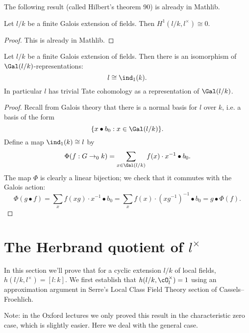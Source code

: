 The following result (called Hilbert's theorem 90) is already in Mathlib.

\begin{theorem}\label{thm:hilbert 90}
	\mathlibok
	Let $l/k$ be a finite Galois extension of fields.
	Then $H^1(l/k, l^\times) \cong 0$.
\end{theorem}

\begin{proof}
	\mathlibok
	This is already in Mathlib.
\end{proof}

\begin{theorem}\label{thm:additive field trivial}
	\leanok
	Let $l/k$ be a finite Galois extension of fields.
	Then there is an isomorphism of $\Gal(l/k)$-representations:
	\[
		l \cong \ind_1(k).
	\]
	In particular $l$ has trivial Tate cohomology as a representation of $\Gal(l/k)$.
\end{theorem}

\begin{proof}
	\leanok
	Recall from Galois theory that there is a normal basis for $l$ over $k$, i.e. a basis of the
	form
	\[
		\{x \bullet b_0 : x \in \Gal(l/k)\}.
	\]
	Define a map $\ind_1(k) \cong l$ by
	\[
		\Phi (f : G \to_0 k) = \sum_{x \in \Gal(l/k)} f(x) \cdot x^{-1} \bullet b_0.
	\]
	The map $\Phi$ is clearly a linear bijection;
	we check that it commutes with the Galois action:
	\[
		\Phi(g\bullet f)
		= \sum_x f(xg) \cdot x^{-1} \bullet b_0
		= \sum_x f(x) \cdot (xg^{-1})^{-1} \bullet b_0
		= g \bullet \Phi(f).
	\]
\end{proof}






\section{The Herbrand quotient of \texorpdfstring{$l^{\times}$}{l*}}

In this section we'll prove that for a cyclic extension $l/k$
of local fields, $h(l/k,l^\times) = [l:k]$. We first establish
that $h(l/k, \cO_l^\times) = 1$ using an approximation argument
in Serre's Local Class Field Theory section of Cassels--Froehlich.

Note: in the Oxford lectures we only proved this result in the
characteristic zero case, which is slightly easier. Here we deal
with the general case.


